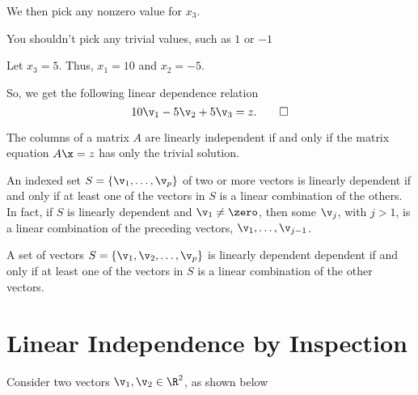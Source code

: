 \begin{solution}
\begin{enumerate}
      We then pick any nonzero value for $x_3$.

      \begin{note}
        \label{nte:dont_pick_trivial_number}

        You shouldn't pick any trivial values, such as $1$ or $-1$
      \end{note}

      Let $x_3 = 5$. Thus, $x_1 = 10$ and $x_2 = -5$.

      So, we get the following linear dependence relation
      \[%
        10\v_1 - 5\v_2 + 5\v_3 = z
      .\qedhere\]%
  \end{enumerate}
\end{solution}

\begin{purpleframe}
  \label{prpl:linear_dependent_matrix_equation}

  The columns of a matrix $A$ are linearly independent if and only if the matrix
  equation $A\x = z$ has only the trivial solution.
\end{purpleframe}

\begin{theorem}
  \label{thm:characterization_of_linearly_dependent_sets}

  An indexed set $S = \left\{\v_1, \dots, \v_p\right\}$ of two or more vectors
  is linearly dependent if and only if at least one of the vectors in $S$ is a
  linear combination of the others. In fact, if $S$ is linearly dependent and
  $\v_1 \ne \zero$, then some $\v_j$, with $j > 1$, is a linear combination of
  the preceding vectors, $\v_1, \dots, \v_{j-1}$.
\end{theorem}

\begin{theorem}
  \label{thm:linearly_dependent}

  A set of vectors $S = \left\{\v_1, \v_2, \ldots, \v_p\right\}$ is linearly
  dependent dependent if and only if at least one of the vectors in $S$ is a
  linear combination of the other vectors.
\end{theorem}

\section{Linear Independence by Inspection}
\label{sec:linear_independence_by_inspection}

Consider two vectors $\v_1, \v_2 \in
\R^2$, as shown below

